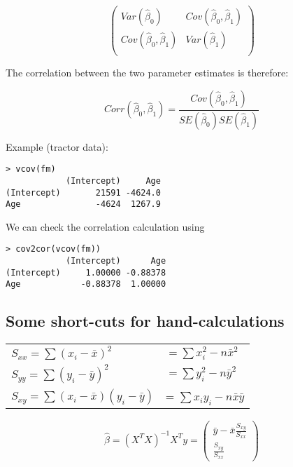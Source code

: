 \begin{equation}
\begin{pmatrix}
Var(\hat{\beta}_0) & Cov(\hat{\beta}_0,\hat{\beta}_1) \\
Cov(\hat{\beta}_0,\hat{\beta}_1) & Var(\hat{\beta}_1)\\
\end{pmatrix}
\end{equation}

The correlation between the two parameter estimates is therefore:

\begin{equation}
Corr(\hat{\beta}_0,\hat{\beta}_1) = \frac{Cov(\hat{\beta}_0,\hat{\beta}_1)}{SE(\hat{\beta}_0) SE(\hat{\beta}_1)}
\end{equation}


Example (tractor data):

\begin{verbatim}
> vcov(fm)
            (Intercept)     Age
(Intercept)       21591 -4624.0
Age               -4624  1267.9
\end{verbatim}

We can check the correlation calculation using

\begin{verbatim}
> cov2cor(vcov(fm))
            (Intercept)      Age
(Intercept)     1.00000 -0.88378
Age            -0.88378  1.00000
\end{verbatim}



\subsection{Some short-cuts for hand-calculations}

\begin{tabular}{@{}ll@{}}
$S_{xx} = \sum (x_i - \bar{x})^2$  & $= \sum x_i^2 - n\bar{x}^2$\\
$S_{yy} = \sum (y_i - \bar{y})^2$ & $= \sum y_i^2 - n\bar{y}^2$\\ 
$S_{xy} = \sum (x_i -\bar{x})(y_i -\bar{y})$ & = $\sum x_i y_i - n\bar{x}\bar{y}$\\
\end{tabular}

\begin{equation}
\hat{\beta} = (X^T X)^{-1} X^T y = 
\begin{pmatrix} 
\bar{y} - \bar{x} \frac{S_{xy}}{S_{xx}}\\
\frac{S_{xy}}{S_{xx}}
\end{pmatrix}
\end{equation}

